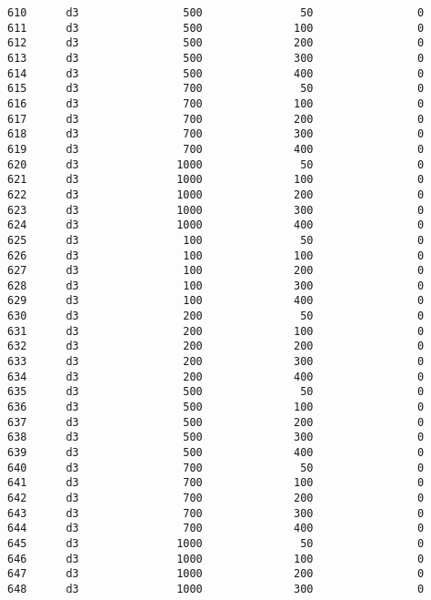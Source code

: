 \documentclass[11pt]{article}
\begin{document}
\begin{Verbatim}[commandchars=\\\{\}]
610      d3                500               50                0   
611      d3                500              100                0   
612      d3                500              200                0   
613      d3                500              300                0   
614      d3                500              400                0   
615      d3                700               50                0   
616      d3                700              100                0   
617      d3                700              200                0   
618      d3                700              300                0   
619      d3                700              400                0   
620      d3               1000               50                0   
621      d3               1000              100                0   
622      d3               1000              200                0   
623      d3               1000              300                0   
624      d3               1000              400                0   
625      d3                100               50                0   
626      d3                100              100                0   
627      d3                100              200                0   
628      d3                100              300                0   
629      d3                100              400                0   
630      d3                200               50                0   
631      d3                200              100                0   
632      d3                200              200                0   
633      d3                200              300                0   
634      d3                200              400                0   
635      d3                500               50                0   
636      d3                500              100                0   
637      d3                500              200                0   
638      d3                500              300                0   
639      d3                500              400                0   
640      d3                700               50                0   
641      d3                700              100                0   
642      d3                700              200                0   
643      d3                700              300                0   
644      d3                700              400                0   
645      d3               1000               50                0   
646      d3               1000              100                0   
647      d3               1000              200                0   
648      d3               1000              300                0   

\end{Verbatim}
\end{document}
